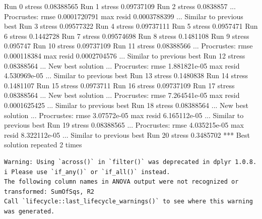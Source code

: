 \documentclass[
]{book}
\newenvironment{Shaded}{\begin{snugshade}}{\end{snugshade}}
\newcommand{\NormalTok}[1]{#1}
\begin{document}
\begin{Shaded}
\begin{Highlighting}[]
\NormalTok{Run 0 stress 0.08388565 }
\NormalTok{Run 1 stress 0.09737109 }
\NormalTok{Run 2 stress 0.0838857 }
\NormalTok{... Procrustes: rmse 0.0001720791  max resid 0.0003788399 }
\NormalTok{... Similar to previous best}
\NormalTok{Run 3 stress 0.09577322 }
\NormalTok{Run 4 stress 0.09737111 }
\NormalTok{Run 5 stress 0.0957471 }
\NormalTok{Run 6 stress 0.1442728 }
\NormalTok{Run 7 stress 0.09574698 }
\NormalTok{Run 8 stress 0.1481108 }
\NormalTok{Run 9 stress 0.095747 }
\NormalTok{Run 10 stress 0.09737109 }
\NormalTok{Run 11 stress 0.08388566 }
\NormalTok{... Procrustes: rmse 0.000118384  max resid 0.0002704576 }
\NormalTok{... Similar to previous best}
\NormalTok{Run 12 stress 0.08388564 }
\NormalTok{... New best solution}
\NormalTok{... Procrustes: rmse 1.881821e{-}05  max resid 4.530969e{-}05 }
\NormalTok{... Similar to previous best}
\NormalTok{Run 13 stress 0.1480838 }
\NormalTok{Run 14 stress 0.1481107 }
\NormalTok{Run 15 stress 0.0973711 }
\NormalTok{Run 16 stress 0.09737109 }
\NormalTok{Run 17 stress 0.08388564 }
\NormalTok{... New best solution}
\NormalTok{... Procrustes: rmse 7.264541e{-}05  max resid 0.0001625425 }
\NormalTok{... Similar to previous best}
\NormalTok{Run 18 stress 0.08388564 }
\NormalTok{... New best solution}
\NormalTok{... Procrustes: rmse 3.07572e{-}05  max resid 6.165112e{-}05 }
\NormalTok{... Similar to previous best}
\NormalTok{Run 19 stress 0.08388565 }
\NormalTok{... Procrustes: rmse 4.035215e{-}05  max resid 8.322112e{-}05 }
\NormalTok{... Similar to previous best}
\NormalTok{Run 20 stress 0.3485702 }
\NormalTok{*** Best solution repeated 2 times}
\end{Highlighting}
\end{Shaded}

\begin{verbatim}
Warning: Using `across()` in `filter()` was deprecated in dplyr 1.0.8.
i Please use `if_any()` or `if_all()` instead.
The following column names in ANOVA output were not recognized or transformed: SumOfSqs, R2
Call `lifecycle::last_lifecycle_warnings()` to see where this warning was generated.
\end{verbatim}
\end{document}
